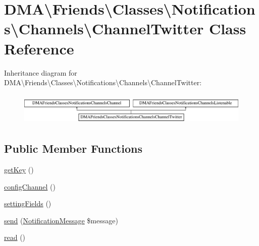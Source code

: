 \hypertarget{classDMA_1_1Friends_1_1Classes_1_1Notifications_1_1Channels_1_1ChannelTwitter}{\section{D\-M\-A\textbackslash{}Friends\textbackslash{}Classes\textbackslash{}Notifications\textbackslash{}Channels\textbackslash{}Channel\-Twitter Class Reference}
\label{classDMA_1_1Friends_1_1Classes_1_1Notifications_1_1Channels_1_1ChannelTwitter}
}
Inheritance diagram for D\-M\-A\textbackslash{}Friends\textbackslash{}Classes\textbackslash{}Notifications\textbackslash{}Channels\textbackslash{}Channel\-Twitter\-:\begin{figure}[H]
\begin{center}
\leavevmode
\includegraphics[height=1.546961cm]{dd/d13/classDMA_1_1Friends_1_1Classes_1_1Notifications_1_1Channels_1_1ChannelTwitter}
\end{center}
\end{figure}
\subsection*{Public Member Functions}
\begin{DoxyCompactItemize}
\item 
\hyperlink{classDMA_1_1Friends_1_1Classes_1_1Notifications_1_1Channels_1_1ChannelTwitter_a8fd04af027221ee77d05e70919c9bd11}{get\-Key} ()
\item 
\hyperlink{classDMA_1_1Friends_1_1Classes_1_1Notifications_1_1Channels_1_1ChannelTwitter_a6e5f6e1abe8d6b7c9d0442c3f2560b44}{config\-Channel} ()
\item 
\hyperlink{classDMA_1_1Friends_1_1Classes_1_1Notifications_1_1Channels_1_1ChannelTwitter_a51e362d79b1978fa683709e2794cb6d5}{setting\-Fields} ()
\item 
\hyperlink{classDMA_1_1Friends_1_1Classes_1_1Notifications_1_1Channels_1_1ChannelTwitter_a14439c4b83e7d0e0dd0437f141a998e5}{send} (\hyperlink{classDMA_1_1Friends_1_1Classes_1_1Notifications_1_1NotificationMessage}{Notification\-Message} \$message)
\item 
\hyperlink{classDMA_1_1Friends_1_1Classes_1_1Notifications_1_1Channels_1_1ChannelTwitter_a3b453a0cb63ace5be8f33763949af5b1}{read} ()
\end{DoxyCompactItemize}


